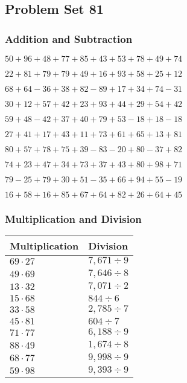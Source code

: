 \hypertarget{problem-set-81}{%
\subsection{Problem Set 81}\label{problem-set-81}}

\hypertarget{addition-and-subtraction}{%
\subsubsection{Addition and
Subtraction}\label{addition-and-subtraction}}

\(50+96+48+77+85+43+53+78+49+74\)

\(22+81+79+79+49+16+93+58+25+12\)

\(68+64-36+38+82-89+17+34+74-31\)

\(30+12+57+42+23+93+44+29+54+42\)

\(59+48-42+37+40+79+53-18+18-18\)

\(27+41+17+43+11+73+61+65+13+81\)

\(80+57+78+75+39-83-20+80-37+82\)

\(74+23+47+34+73+37+43+80+98+71\)

\(79-25+79+30+51-35+66+94+55-19\)

\(16+58+16+85+67+64+82+26+64+45\)

\hypertarget{multiplication-and-division}{%
\subsubsection{Multiplication and
Division}\label{multiplication-and-division}}

\begin{longtable}[]{@{}ll@{}}
\toprule
Multiplication & Division\tabularnewline
\midrule
\endhead
\(69\cdot27\) & \(7,671÷9\)\tabularnewline
\(49\cdot69\) & \(7,646÷8\)\tabularnewline
\(13\cdot32\) & \(7,071÷2\)\tabularnewline
\(15\cdot68\) & \(844÷6\)\tabularnewline
\(33\cdot58\) & \(2,785÷7\)\tabularnewline
\(45\cdot81\) & \(604÷7\)\tabularnewline
\(71\cdot77\) & \(6,188÷9\)\tabularnewline
\(88\cdot49\) & \(1,674÷8\)\tabularnewline
\(68\cdot77\) & \(9,998÷9\)\tabularnewline
\(59\cdot98\) & \(9,393÷9\)\tabularnewline
\bottomrule
\end{longtable}
